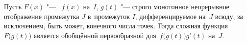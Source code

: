 
  Пусть $F(x)$ "--- \op\ $f(x)$ на~$I$, $g(t)$ "--- строго монотонное непрерывное отображение промежутка $J$ в~промежуток $I$, дифференцируемое на~$J$
  всюду, за исключением, быть может, конечного числа точек. Тогда сложная функция $F\big(g(t)\big)$ является обобщённой первообразной для~$f\big(g(t)\big)g'(t)$ на~$J$.
